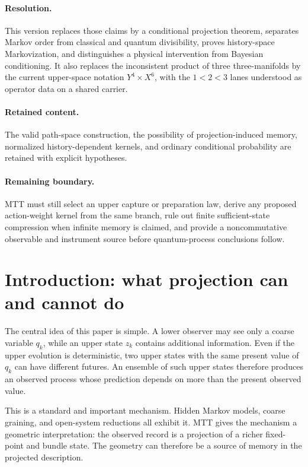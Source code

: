 \documentclass[11pt]{article}
\theoremstyle{definition}
\theoremstyle{remark}
\begin{document}
\paragraph{Resolution.}
This version replaces those claims by a conditional projection theorem,
separates Markov order from classical and quantum divisibility, proves
history-space Markovization, and distinguishes a physical intervention from
Bayesian conditioning.  It also replaces the inconsistent product of three
three-manifolds by the current upper-space notation \(Y^4\times X^6\), with
the \(1<2<3\) lanes understood as operator data on a shared carrier.

\paragraph{Retained content.}
The valid path-space construction, the possibility of projection-induced
memory, normalized history-dependent kernels, and ordinary conditional
probability are retained with explicit hypotheses.

\paragraph{Remaining boundary.}
MTT must still select an upper capture or preparation law, derive any proposed
action-weight kernel from the same branch, rule out finite sufficient-state
compression when infinite memory is claimed, and provide a noncommutative
observable and instrument source before quantum-process conclusions follow.

\tableofcontents

\section{Introduction: what projection can and cannot do}

The central idea of this paper is simple.  A lower observer may see only a
coarse variable \(q_k\), while an upper state \(z_k\) contains additional
information.  Even if the upper evolution is deterministic, two upper states
with the same present value of \(q_k\) can have different futures.  An ensemble
of such upper states therefore produces an observed process whose prediction
depends on more than the present observed value.

This is a standard and important mechanism.  Hidden Markov models, coarse
graining, and open-system reductions all exhibit it.  MTT gives the mechanism
a geometric interpretation: the observed record is a projection of a richer
fixed-point and bundle state.  The geometry can therefore be a source of
memory in the projected description.
\end{document}
